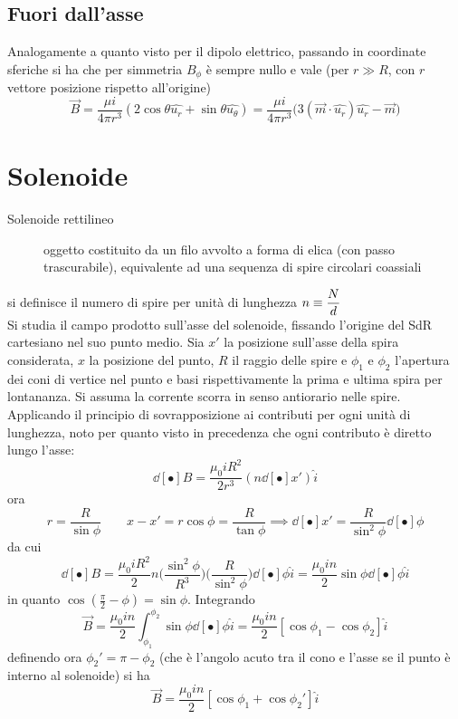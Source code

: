 \subsection{Fuori dall'asse}
Analogamente a quanto visto per il dipolo elettrico, passando in coordinate sferiche si ha che per simmetria $B_\phi$ è sempre nullo e vale (per $r \gg R$, con $r$ vettore posizione rispetto all'origine)
\[\vec{B} = \frac{\mu i}{4 \pi r^3} (2 \cos \theta \hat{u_r} + \sin \theta \hat{u_\theta}) = \frac{\mu i}{4 \pi r^3} \big(3 (\vec{m} \cdot \hat{u_r}) \hat{u_r} - \vec{m}\big)\]

\section{Solenoide}
\begin{description}
\item[Solenoide rettilineo] oggetto costituito da un filo avvolto a forma di elica (con passo trascurabile), equivalente ad una sequenza di spire circolari coassiali
\end{description}
si definisce il numero di spire per unità di lunghezza $\displaystyle n \equiv \frac{N}{d}$
\\Si studia il campo prodotto sull'asse del solenoide, fissando l'origine del SdR cartesiano nel suo punto medio. Sia $x'$ la posizione sull'asse della spira considerata, $x$ la posizione del punto, $R$ il raggio delle spire e $\phi_1$ e $\phi_2$ l'apertura dei coni di vertice nel punto e basi rispettivamente la prima e ultima spira per lontananza. Si assuma la corrente scorra in senso antiorario nelle spire.
\\Applicando il principio di sovrapposizione ai contributi per ogni unità di lunghezza, noto per quanto visto in precedenza che ogni contributo è diretto lungo l'asse:
\[\dd[•]{B} = \frac{\mu_0 i R^2}{2 r^3} (n \dd[•]{x'}) \hat{i}\]
ora
\[r = \frac{R}{\sin \phi} \qquad x - x' = r \cos \phi = \frac{R}{\tan \phi} \implies \dd[•]{x'} = \frac{R}{\sin^2 \phi} \dd[•]{\phi}\]
da cui
\[\dd[•]{B} = \frac{\mu_0 i R^2}{2} n \big(\frac{\sin^2 \phi}{R^3}\big) \big(\frac{R}{\sin^2 \phi}\big) \dd[•]{\phi}\hat{i} = \frac{\mu_0 i n}{2} \sin \phi \dd[•]{\phi} \hat{i}\]
in quanto $\cos (\frac{\pi}{2} - \phi) = \sin \phi$. Integrando
\[\vec{B} = \frac{\mu_0 i n}{2} \int_{\phi_1}^{\phi_2} \sin \phi \dd[•]{\phi} \hat{i} = \frac{\mu_0 i n}{2} [\cos \phi_1 - \cos \phi_2] \hat{i}\]
definendo ora $\phi_2' = \pi - \phi_2$ (che è l'angolo acuto tra il cono e l'asse se il punto è interno al solenoide) si ha
\[\vec{B} = \frac{\mu_0 i n}{2} [\cos \phi_1 + \cos \phi_2'] \hat{i}\]

